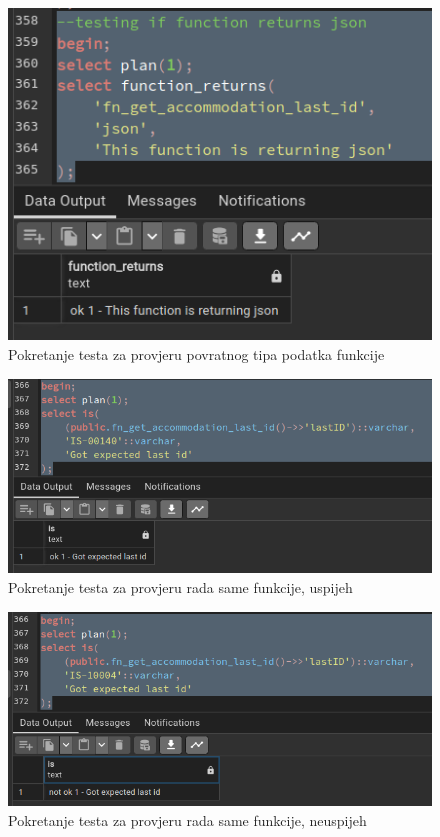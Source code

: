 				\begin{figure}[H]
					\centering
					\includegraphics[width=\textwidth]{slike/unit_tests/ut_6/func_return.png}
					\caption{Pokretanje testa za provjeru povratnog tipa podatka funkcije}
					\label{fig: IS6-function_return}
				\end{figure}
				\begin{figure}[H]
					\centering
					\includegraphics[width=\textwidth]{slike/unit_tests/ut_6/success_invocation.png}
					\caption{Pokretanje testa za provjeru rada same funkcije, uspijeh}
					\label{fig: IS6-uspješno dohvaćen posljednji realestateid}
				\end{figure}
				\begin{figure}[H]
					\centering
					\includegraphics[width=\textwidth]{slike/unit_tests/ut_6/failure_invocation.png}
					\caption{Pokretanje testa za provjeru rada same funkcije, neuspijeh}
					\label{fig: IS6-navedeni realestateid ne postoji}
				\end{figure}
